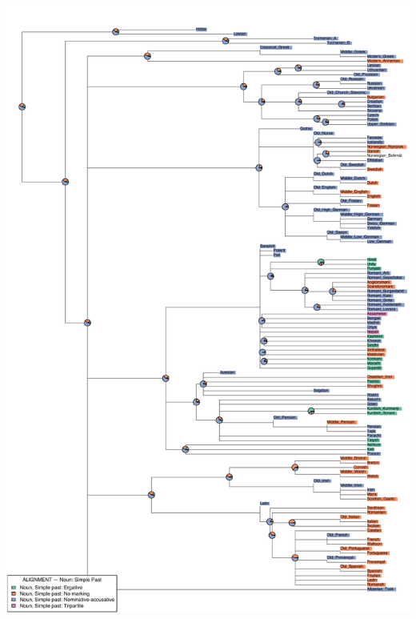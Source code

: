 \includegraphics[width=.9\linewidth]{supp-graphics/ALIGNMENTNounSimplePastNPSTOSoALIGNMENTNounSimplePastNPSTAOALIGNMENTNounSimplePastNPSTASaALIGNMENTNounSimplePastNPSTSaSo.pdf}

